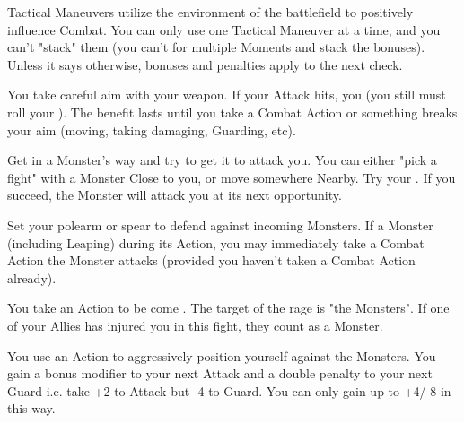   Tactical Maneuvers utilize the environment of the battlefield to positively influence Combat. You can only use one Tactical Maneuver at a time, and you can't "stack" them (you can't  for multiple Moments and stack the bonuses). Unless it says otherwise, bonuses and penalties apply to the next \RO check.


\begin{multicols*}{2}


  \COMBAT [
    Name = Aim,
    Link = combat-tactical-maneuver-aim,
    Desc = Shoot or Throw Weapons Only
  ]
  
  You take careful aim with your weapon.  If your  Attack \RO hits, you  (you still must roll your \FOC). The benefit lasts until you take a Combat Action or something breaks your aim (moving, taking damaging, Guarding, etc).

  \COMBAT [
    Name = Block,
    Link = combat-tactical-maneuver-block,
    Desc = Brawl weapons only
  ]

  Get in a Monster's way and try to get it to attack you.  You can either "pick a fight" with a Monster Close to you, or move somewhere Nearby. Try your \RSTRY{\PRE}.  If you succeed, the Monster will attack you at its next opportunity.

  \COMBAT [
    Name = Brace,
    Link = combat-tactical-maneuver-brace,
    Desc = Polearm or spear only
  ]

  Set your polearm or spear to defend against incoming Monsters.  If a Monster  (including Leaping) during its Action, you may immediately take a Combat Action  the Monster attacks (provided you haven't taken a Combat Action already).

\cbreak

  \COMBAT [
    Name = Rage,
    Link = combat-tactical-maneuver-rage,
    Desc = Brawl weapons only
  ]

  You take an Action to be come .  The target of the rage is "the Monsters". If one of your Allies has injured you in this fight, they count as a Monster.

  \COMBAT [
    Name = Reckless,
    Link = combat-tactical-maneuver-reckless,
    Desc = Brawl weapons only
  ]

  You use an Action to aggressively position yourself against the Monsters.  You gain a bonus modifier to your next Attack \RO and a double penalty to your next Guard \RO i.e. take +2 to Attack but -4 to Guard.  You can only gain up to +4/-8 in this way.


\end{multicols*}
